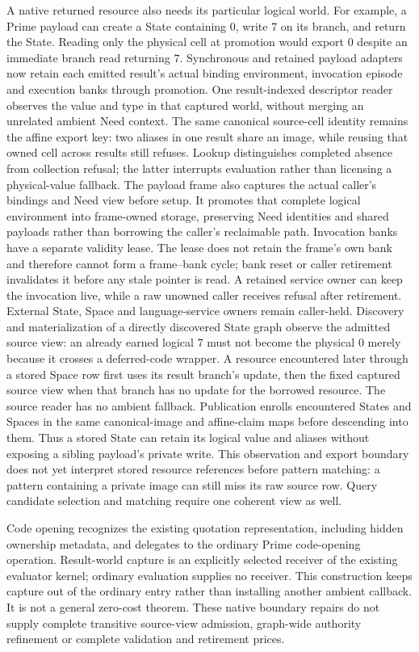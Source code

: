 \documentclass[11pt]{article}
\theoremstyle{definition}
\theoremstyle{remark}
\begin{document}
A native returned resource also needs its particular logical world. For
example, a Prime payload can create a State containing $0$, write $7$ on its
branch, and return the State. Reading only the physical cell at promotion
would export $0$ despite an immediate branch read returning $7$. Synchronous
and retained payload adapters now retain each emitted result's actual binding
environment, invocation episode and execution banks through promotion. One
result-indexed descriptor reader observes the value and type in that captured
world, without merging an unrelated ambient Need context. The same canonical
source-cell identity remains the affine export key: two aliases in one result
share an image, while reusing that owned cell across results still refuses.
Lookup distinguishes completed absence from collection refusal; the latter
interrupts evaluation rather than licensing a physical-value fallback.
The payload frame also captures the actual caller's bindings and Need view
before setup. It promotes that complete logical environment into frame-owned
storage, preserving Need identities and shared payloads rather than borrowing
the caller's reclaimable path. Invocation banks have a separate validity
lease. The lease does not retain the frame's own bank and therefore cannot
form a frame--bank cycle; bank reset or caller retirement invalidates it before
any stale pointer is read. A retained service owner can keep the invocation
live, while a raw unowned caller receives refusal after retirement. External
State, Space and language-service owners remain caller-held. Discovery and
materialization of a directly discovered State graph observe the admitted
source view: an already earned logical $7$ must not become the physical $0$
merely because it crosses a deferred-code wrapper. A resource encountered
later through a stored Space row first
uses its result branch's update, then the fixed captured source view when that
branch has no update for the borrowed resource. The source reader has no
ambient fallback. Publication enrolls encountered States and Spaces in the
same canonical-image and affine-claim maps before descending into them.
Thus a stored State can retain its logical value and aliases without exposing
a sibling payload's private write. This observation and export boundary does
not yet interpret stored resource references before pattern matching: a
pattern containing a private image can still miss its raw source row. Query
candidate selection and matching require one coherent view as well.

Code opening recognizes the existing quotation representation,
including hidden ownership metadata, and delegates to the ordinary Prime
code-opening operation. Result-world capture is an explicitly selected
receiver of the existing evaluator kernel; ordinary evaluation supplies no
receiver. This construction keeps capture out of the ordinary entry rather
than installing another ambient callback. It is not a general zero-cost
theorem. These native boundary repairs do not supply complete transitive
source-view admission, graph-wide authority refinement or complete validation
and retirement prices.
\end{document}
